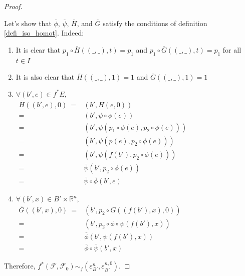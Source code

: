 \documentclass[12pt,oneside]{book}
\newcommand{\R}{\mathbb{R}}
\begin{document}
\begin{proof}
        \
    
        Let's show that $\overline{\phi}$, $\overline{\psi}$, $\overline{H}$, and $\overline{G}$ satisfy the conditions of definition 
        \ref{defi_iso_homot}. Indeed:
    
        \begin{enumerate}
            \item It is clear that $p_{1}\circ\overline{H}((\_,\_),t)=p_{1}$ and $p_{1}\circ\overline{G}((\_,\_),t)=p_{1}$ for all $t\in I$
            \item It is also clear that $\overline{H}((\_,\_),1)=1$ and $\overline{G}((\_,\_),1)=1$
            \item $\forall (b',e)\in f^{*}E$, \\
                   
                    $\begin{array}{rl}
                        \overline{H}((b',e),0) \ = & (b',H(e,0)) \\
                        = & (b',\psi\circ\phi(e)) \\
                        = & (b',\psi(p_{1}\circ\phi(e),p_{2}\circ\phi(e))) \\
                        = & (b',\psi(p(e),p_{2}\circ\phi(e))) \\
                        = & (b',\psi(f(b'),p_{2}\circ\phi(e))) \\
                        = & \overline{\psi}(b',p_{2}\circ\phi(e)) \\
                        = & \overline{\psi}\circ\overline{\phi}(b',e)
                    \end{array}$
            \item $\forall (b',x)\in B'\times\R^{n}$, \\
                    
                    $\begin{array}{rl}
                        \overline{G}((b',x),0) \ = & (b',p_{2}\circ G((f(b'),x),0)) \\
                        = & (b',p_{2}\circ\phi\circ\psi(f(b'),x)) \\
                        = & \overline{\phi}(b',\psi(f(b'),x)) \\
                        = & \overline{\phi}\circ\overline{\psi}(b',x)
                    \end{array}$
        \end{enumerate}
    
        \par Therefore, $f^{*}(\mathcal{F},\mathcal{F}_{0})\sim_{f}(\varepsilon_{B'}^{n},\varepsilon_{B'}^{n,0})$.
    
    \end{proof}
\end{document}
